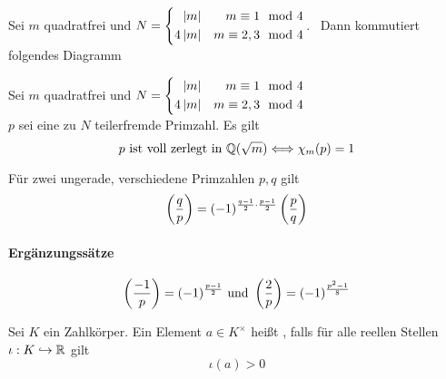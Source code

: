 \Satz{}
Sei $m$ quadratfrei und $N = 
\left\lbrace\begin{aligned}
\left|m\right| && m \equiv 1 \mod{4}\\
4\left|m\right| && m \equiv 2,3 \mod{4}
\end{aligned}\right.$. \ Dann kommutiert folgendes Diagramm
\begin{center}
\end{center}

\Satz{}
Sei $m$ quadratfrei und $N = 
\left\lbrace\begin{aligned}
\left|m\right| && m \equiv 1 \mod{4}\\
4\left|m\right| && m \equiv 2,3 \mod{4}
\end{aligned}\right.$\\
$p$ sei eine zu $N$ teilerfremde Primzahl. Es gilt
\[ p \text{ ist voll zerlegt in } \mathbb{Q}(\sqrt{m}) \overset{}{\Longleftrightarrow} \chi_m(p) = 1 \]

Für zwei ungerade, verschiedene Primzahlen $p,q$ gilt
\[ \left(\frac{q}{p}\right) = (-1)^{\frac{q-1}{2} \cdot \frac{p-1}{2} } \left(\frac{p}{q}\right) \]

\paragraph{Ergänzungssätze}
\[ \left(\frac{-1}{p}\right) = (-1)^{\frac{p-1}{2}} \text{ und } \left(\frac{2}{p}\right) = (-1)^{\frac{p^2-1}{8}} \]

\Def{}
Sei $K$ ein Zahlkörper. Ein Element $a \in K^\times$ heißt , falls für alle reellen Stellen $\iota : K \overset{}{\hookrightarrow} \mathbb{R}$ gilt
\[ \iota(a) > 0 \]

